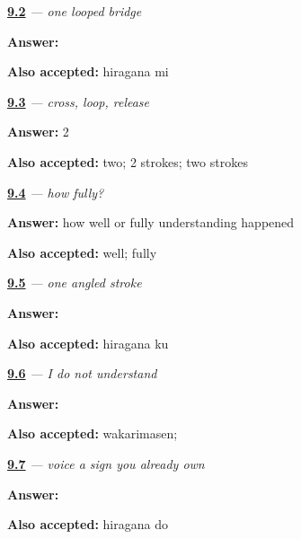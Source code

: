 \noindent\begin{minipage}[t]{\linewidth}
\raggedright
\hyperlink{review-JA-W09-mi-select}{\textbf{9.2}} \emph{ — one looped bridge}\par
\small \textbf{Answer:} \par
\footnotesize \textbf{Also accepted:} hiragana mi
\end{minipage}\par\medskip

\noindent\begin{minipage}[t]{\linewidth}
\raggedright
\hyperlink{review-JA-W09-me-strokes}{\textbf{9.3}} \emph{ — cross, loop, release}\par
\small \textbf{Answer:} 2\par
\footnotesize \textbf{Also accepted:} two; 2 strokes; two strokes
\end{minipage}\par\medskip

\noindent\begin{minipage}[t]{\linewidth}
\raggedright
\hyperlink{review-JA-C09-yoku-meaning}{\textbf{9.4}} \emph{ — how fully?}\par
\small \textbf{Answer:} how well or fully understanding happened\par
\footnotesize \textbf{Also accepted:} well; fully
\end{minipage}\par\medskip

\noindent\begin{minipage}[t]{\linewidth}
\raggedright
\hyperlink{review-JA-W09-ku-write}{\textbf{9.5}} \emph{ — one angled stroke}\par
\small \textbf{Answer:} \par
\footnotesize \textbf{Also accepted:} hiragana ku
\end{minipage}\par\medskip

\noindent\begin{minipage}[t]{\linewidth}
\raggedright
\hyperlink{review-JA-C09-wakarimasen-response}{\textbf{9.6}} \emph{ — I do not understand}\par
\small \textbf{Answer:} \par
\footnotesize \textbf{Also accepted:} wakarimasen; 
\end{minipage}\par\medskip

\noindent\begin{minipage}[t]{\linewidth}
\raggedright
\hyperlink{review-JA-W09-do-build}{\textbf{9.7}} \emph{ — voice a sign you already own}\par
\small \textbf{Answer:} \par
\footnotesize \textbf{Also accepted:} hiragana do
\end{minipage}\par\medskip

